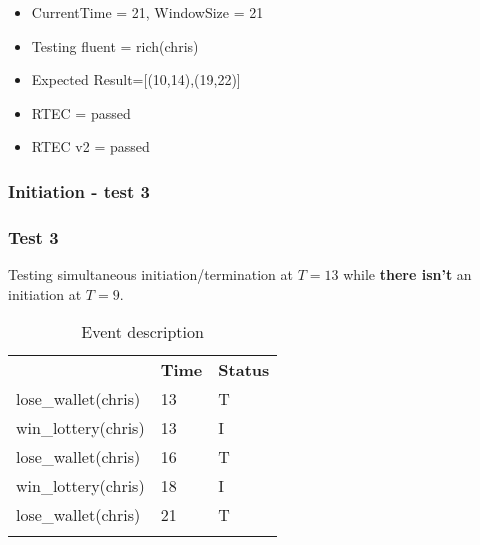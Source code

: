 \documentclass[8pt]{beamer}
\begin{document}
\begin{frame}
\begin{minipage}{0.48\linewidth}
    \end{minipage}
    \begin{itemize}
            \small
        \item CurrentTime = 21, WindowSize = 21
        \item Testing fluent = rich(chris)
        \item Expected Result=[(10,14),(19,22)]
        \item RTEC = passed
        \item RTEC v2 = passed
    \end{itemize}
\end{frame}

\begin{frame}
    \frametitle{Initiation - test 3}
    \subsubsection{Test 3}
    \small
    Testing simultaneous initiation/termination at $T=13$ while \textbf{there isn't} an initiation at $T=9$.
    \begin{minipage}{0.5\linewidth}
        \begin{table}[t!]
            \caption{Event description}
            \begin{center}
                \begin{tabular}{lll}
                    \hline\noalign{\smallskip}
                    \multicolumn{1}{l}{\textbf{Event}} & \multicolumn{1}{c}{\textbf{Time}}&\multicolumn{1}{l}{\textbf{Status}}   \\
                    lose\_wallet(chris)& 13&T\\
                    win\_lottery(chris)& 13&I\\
                    lose\_wallet(chris)& 16&T\\
                    win\_lottery(chris)& 18&I\\
                    lose\_wallet(chris)& 21&T\\
                    \noalign{\smallskip}
                    \hline
                \end{tabular}
            \end{center}
        \end{table}
    \end{minipage}%
    \begin{minipage}{0.5\linewidth}


\end{minipage}
\end{frame}
\end{document}
